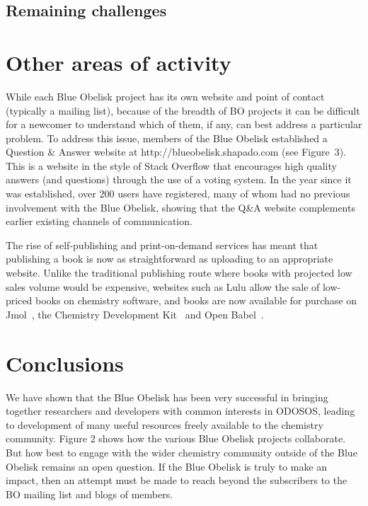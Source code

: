 \documentclass[10pt]{bmc_article}
\newenvironment{bmcformat}{\fussy\setboolean{publ}{true}}{\fussy}
\begin{document}
\begin{bmcformat}
  \subsection*{Remaining challenges}

\section*{Other areas of activity}

While each Blue Obelisk project has its own website and point of
contact (typically a mailing list), because of the breadth of BO
projects it can be difficult for a newcomer to understand which of
them, if any, can best address a particular problem. To address this
issue, members of the Blue Obelisk established a Question \& Answer
website at http://blueobelisk.shapado.com (see Figure~3). 
This is a website in the
style of Stack Overflow that encourages high quality answers (and
questions) through the use of a voting system. In the year since it
was established, over
200 users have registered, many of whom had no previous involvement
with the Blue Obelisk, showing that the Q\&A website complements
earlier existing channels of communication.

The rise of self-publishing and print-on-demand services has meant
that publishing a book is now as straightforward as uploading to an
appropriate website. Unlike the traditional publishing route where
books with projected low sales volume would be expensive,
websites such as Lulu allow the sale of low-priced books on
chemistry software, and books are now available for purchase
on Jmol~\cite{JmolBook}, the Chemistry Development Kit~\cite{CDKBook}
and Open Babel~\cite{OpenBabelBook}.

\section*{Conclusions}

We have shown that the Blue Obelisk has been very successful
in bringing together researchers and developers with common interests
in ODOSOS, leading to development of many useful resources freely
available to the chemistry community. Figure 2 shows how the various
Blue Obelisk projects collaborate. But how best to engage with the
wider chemistry community outside of the Blue Obelisk remains an open
question. If the Blue Obelisk is truly to make an impact,
then an attempt must be made to reach beyond the subscribers to the
BO mailing list and blogs of members.


\end{bmcformat}
\end{document}
